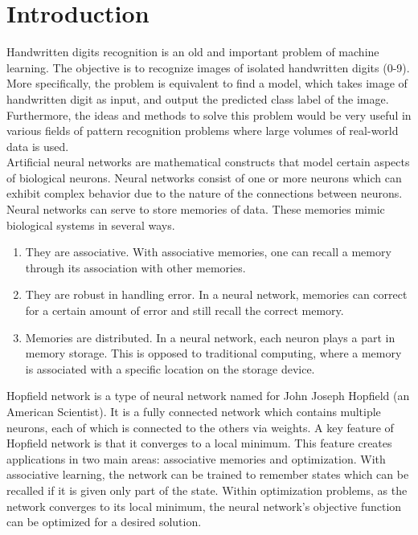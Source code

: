 \section{Introduction}
Handwritten digits recognition is an old and important problem of machine learning. The objective is to recognize images of isolated handwritten digits (0-9). More
specifically, the problem is equivalent to find a model, which takes image of handwritten digit as input, and output the predicted class label of the image.
Furthermore, the ideas and methods to solve this problem would be very useful in various fields of pattern recognition problems where large volumes of real-world data is used\cite{bib:Prachi}.\\

Artificial neural networks are mathematical constructs that model certain aspects of biological neurons. Neural networks consist of one or more neurons which can exhibit complex behavior due to the nature of the connections between neurons. Neural networks can serve to store memories of data. These memories mimic biological systems in several ways\cite{bib:info-theory}.
\begin{enumerate}
	\item They are associative. With associative memories, one can recall a memory through its association with other memories.
	\item They are robust in handling error. In a neural network, memories can correct for a certain amount of error and still recall the correct memory.
	\item Memories are distributed. In a neural network, each neuron plays a part in memory storage. This is opposed to traditional computing, where a memory is associated with a specific location on the storage device.
\end{enumerate}

Hopfield network is a type of neural network named for John Joseph Hopfield (an American Scientist). It is a fully connected network which contains multiple neurons, each of which is connected to the others via weights. A key feature of Hopfield network is that it converges to a local minimum. This feature creates applications in two main areas: associative memories and optimization. With associative learning, the network can be trained to remember states which can be recalled if it is given only part of the state. Within optimization problems, as the network converges to its local minimum, the neural network's objective function can be optimized for a desired solution.